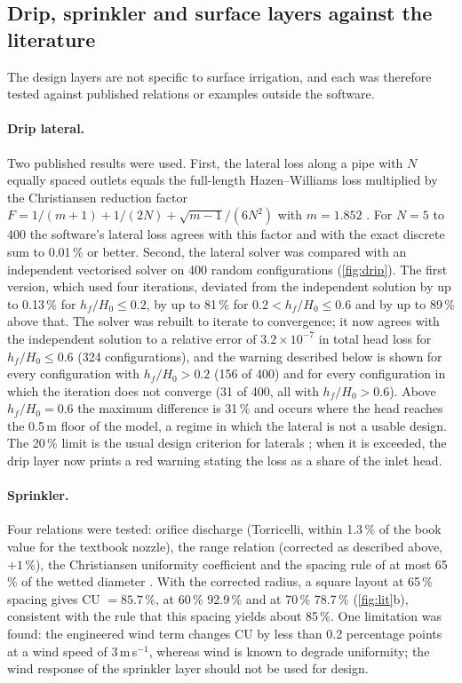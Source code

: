 \documentclass[preprint,12pt]{elsarticle}
\begin{document}
\subsection{Drip, sprinkler and surface layers against the literature}
\label{sec:drip}
The design layers are not specific to surface irrigation, and each was therefore tested against published relations or examples outside the software.

\paragraph{Drip lateral.} Two published results were used. First, the lateral loss along a pipe with $N$ equally spaced outlets equals the full-length Hazen--Williams loss multiplied by the Christiansen reduction factor $F=1/(m+1)+1/(2N)+\sqrt{m-1}/(6N^2)$ with $m=1.852$ \cite{Christiansen1942,Keller1990}. For $N=5$ to 400 the software's lateral loss agrees with this factor and with the exact discrete sum to 0.01\,\% or better. Second, the lateral solver was compared with an independent vectorised solver on 400 random configurations (\cref{fig:drip}). The first version, which used four iterations, deviated from the independent solution by up to 0.13\,\% for $h_f/H_0\le0.2$, by up to 81\,\% for $0.2<h_f/H_0\le0.6$ and by up to 89\,\% above that. The solver was rebuilt to iterate to convergence; it now agrees with the independent solution to a relative error of $3.2\times10^{-7}$ in total head loss for $h_f/H_0\le0.6$ (324 configurations), and the warning described below is shown for every configuration with $h_f/H_0>0.2$ (156 of 400) and for every configuration in which the iteration does not converge (31 of 400, all with $h_f/H_0>0.6$). Above $h_f/H_0=0.6$ the maximum difference is 31\,\% and occurs where the head reaches the 0.5\,m floor of the model, a regime in which the lateral is not a usable design. The 20\,\% limit is the usual design criterion for laterals \cite{KellerKarmeli1974,Keller1990}; when it is exceeded, the drip layer now prints a red warning stating the loss as a share of the inlet head.

\paragraph{Sprinkler.} Four relations were tested: orifice discharge (Torricelli, within 1.3\,\% of the book value for the textbook nozzle), the range relation (corrected as described above, $+1$\,\%), the Christiansen uniformity coefficient and the spacing rule of at most 65\,\% of the wetted diameter \cite{Keller1990}. With the corrected radius, a square layout at 65\,\% spacing gives CU $=85.7$\,\%, at 60\,\% 92.9\,\% and at 70\,\% 78.7\,\% (\cref{fig:lit}b), consistent with the rule that this spacing yields about 85\,\%. One limitation was found: the engineered wind term changes CU by less than 0.2 percentage points at a wind speed of 3\,m\,s$^{-1}$, whereas wind is known to degrade uniformity; the wind response of the sprinkler layer should not be used for design.
\end{document}
